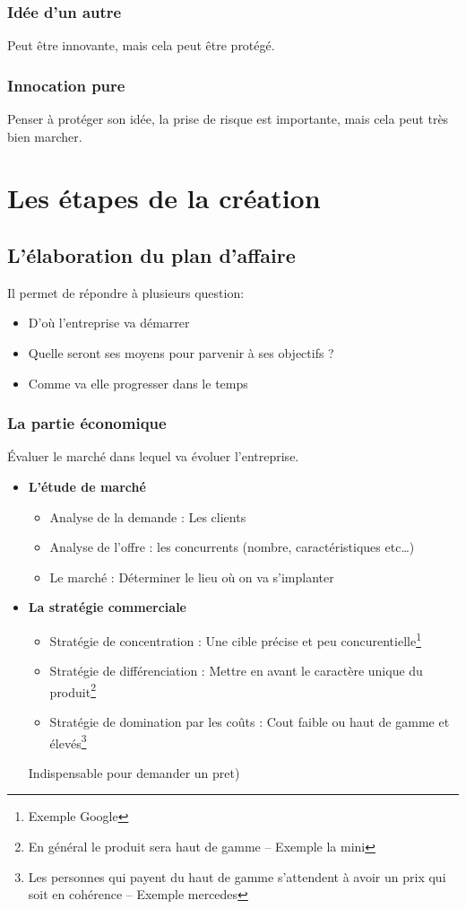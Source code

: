 \documentclass[12pt,a4paper,openany]{report}
\begin{document}
	\subsection{Idée d'un autre}
	Peut être innovante, mais cela peut être protégé.
	\subsection{Innocation pure}
	Penser à protéger son idée, la prise de risque est importante, mais cela peut très bien marcher. 
	\chapter{Les étapes de la création}
	\section{L'élaboration du plan d'affaire}
	Il permet de répondre à plusieurs question:
		\begin{itemize}
			\item D'où l'entreprise va démarrer
			\item Quelle seront ses moyens pour parvenir à ses objectifs ?
			\item Comme va elle progresser dans le temps
		\end{itemize}
	\subsection{La partie économique}
		Évaluer le marché dans lequel va évoluer l'entreprise. 
		\begin{itemize}
			\item\textbf{ L'étude de marché }
				\begin{itemize}
					\item Analyse de la demande : Les clients
					\item Analyse de l'offre : les concurrents (nombre, caractéristiques etc\ldots)
					\item Le marché : Déterminer le lieu où on va s'implanter
				\end{itemize}
			\item \textbf{La stratégie commerciale }
				\begin{itemize}
					\item Stratégie de concentration : Une cible précise et peu concurentielle\footnote{Exemple Google}
					\item Stratégie de différenciation : Mettre en avant le caractère unique du produit\footnote{En général le produit sera haut de gamme 
						-- Exemple la mini}
					\item Stratégie de domination par les coûts : Cout faible ou haut de gamme et élevés\footnote{Les personnes qui payent du haut de gamme
						s'attendent à avoir un prix qui soit en cohérence -- Exemple mercedes}
				\end{itemize}
				Indispensable pour demander un pret)
		\end{itemize}
\end{document}
